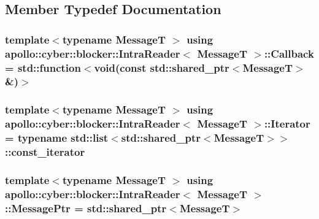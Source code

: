 \subsection{Member Typedef Documentation}
\hypertarget{classapollo_1_1cyber_1_1blocker_1_1IntraReader_a15cf88ac9399d324aeb685bec11c8afe}{
\subsubsection[{Callback}]{\setlength{\rightskip}{0pt plus 5cm}template$<$typename Message\-T $>$ using {\bf apollo\-::cyber\-::blocker\-::\-Intra\-Reader}$<$ Message\-T $>$\-::{\bf Callback} =  std\-::function$<$void(const std\-::shared\-\_\-ptr$<$Message\-T$>$\&)$>$}}\label{classapollo_1_1cyber_1_1blocker_1_1IntraReader_a15cf88ac9399d324aeb685bec11c8afe}
\hypertarget{classapollo_1_1cyber_1_1blocker_1_1IntraReader_a34f048290fe0ff40e672a485835ccfc9}{
\subsubsection[{Iterator}]{\setlength{\rightskip}{0pt plus 5cm}template$<$typename Message\-T $>$ using {\bf apollo\-::cyber\-::blocker\-::\-Intra\-Reader}$<$ Message\-T $>$\-::{\bf Iterator} =  typename std\-::list$<$std\-::shared\-\_\-ptr$<$Message\-T$>$$>$\-::const\-\_\-iterator}}\label{classapollo_1_1cyber_1_1blocker_1_1IntraReader_a34f048290fe0ff40e672a485835ccfc9}
\hypertarget{classapollo_1_1cyber_1_1blocker_1_1IntraReader_aa4e9071f397bee80ba4ab42e7d1f165d}{
\subsubsection[{Message\-Ptr}]{\setlength{\rightskip}{0pt plus 5cm}template$<$typename Message\-T $>$ using {\bf apollo\-::cyber\-::blocker\-::\-Intra\-Reader}$<$ Message\-T $>$\-::{\bf Message\-Ptr} =  std\-::shared\-\_\-ptr$<$Message\-T$>$}}\label{classapollo_1_1cyber_1_1blocker_1_1IntraReader_aa4e9071f397bee80ba4ab42e7d1f165d}


